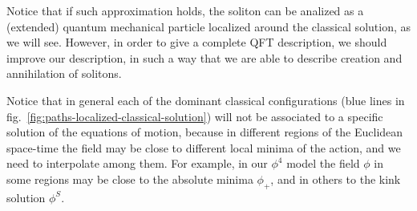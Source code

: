 \documentclass[../main/main.tex]{subfiles}
\begin{document}
Notice that if such approximation holds, the soliton can be analized as a (extended) quantum mechanical particle localized around the classical solution, as we will see. However, in order to give a complete QFT description, we should improve our description, in such a way that we are able to describe creation and annihilation of solitons. 

\skipline

Notice that in general each of the dominant classical configurations (blue lines in fig.~\ref{fig:paths-localized-classical-solution}) will not be associated to a specific solution of the equations of motion, because in different regions of the Euclidean space-time the field may be close to different local minima of the action, and we need to interpolate among them. For example, in our $\phi^4$ model the field $\phi$ in some regions may be close to the absolute minima $\phi_+$, and in others to the kink solution $\phi^S$. 
\end{document}
